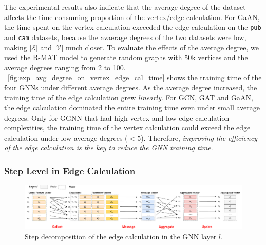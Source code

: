 The experimental results also indicate that the average degree of the dataset affects the time-consuming proportion of the vertex/edge calculation.
For GaAN, the time spent on the vertex calculation exceeded the edge calculation on the \texttt{pub} and \texttt{cam} datasets, because the avaerage degrees of the two datasets were low, making $|\mathcal{E}|$ and $|\mathcal{V}|$ much closer.
To evaluate the effects of the average degree, we used the R-MAT model to generate random graphs with 50k vertices and the average degrees ranging from 2 to 100.
\figurename~\ref{fig:exp_avg_degree_on_vertex_edge_cal_time} shows the training time of the four GNNs under different average degrees.
As the average degree increased, the training time of the edge calculation grew \emph{linearly}.
For GCN, GAT and GaAN, the edge calculation dominated the entire training time even under small average degrees.
Only for GGNN that had high vertex and low edge calculation complexities, the training time of the vertex calculation could exceed the edge calculation under low average degrees ($<5$).
Therefore, \emph{improving the efficiency of the edge calculation is the key to reduce the GNN training time}.

\subsubsection{Step Level in Edge Calculation}

\begin{figure}
    \centering
    \includegraphics[width=1\columnwidth]{figs/illustration/steps_in_edge_calculation.pdf}
    \caption{Step decomposition of the edge calculation in the GNN layer $l$.}
    \label{fig:steps_in_edge_calculation}
\end{figure}

